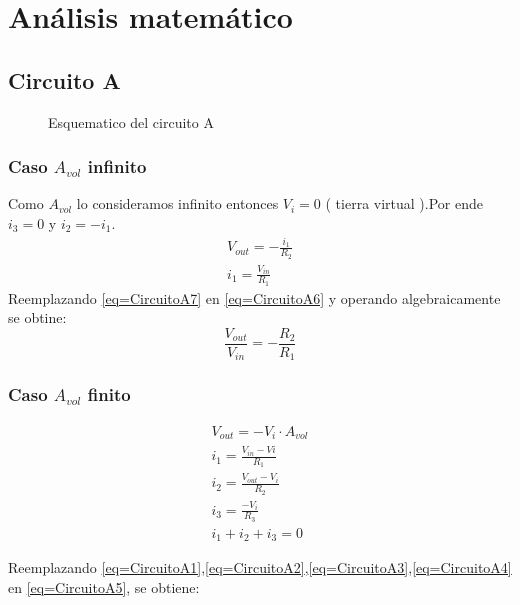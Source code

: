 \documentclass[../../main.tex]{subfiles}
\begin{document}
\section{An\'alisis matem\'atico}
\subsection{Circuito A}

\begin{figure}[H]
\centering



\caption{Esquematico del circuito A}
\end{figure}


\subsubsection{Caso $A_{vol}$ infinito}

Como $A_{vol}$ lo consideramos infinito entonces $V_{i}=0$ \big( tierra virtual \big).Por ende $i_{3}=0$ y $i_{2}=-i_{1}$.
\begin{gather}
V_{out}=-\frac{i_{1}}{R_{2}}\label{eq=CircuitoA6}\\
i_{1}=\frac{V_{in}}{R_{1}}\label{eq=CircuitoA7}
\end{gather}
Reemplazando \ref{eq=CircuitoA7} en \ref{eq=CircuitoA6} y operando algebraicamente se obtine:
\begin{equation}
\frac{V_{out}}{V_{in}}= -\frac{R_{2}}{R_{1}} \label{eq=CircuitoAideal}
\end{equation}


\subsubsection{Caso $A_{vol}$ finito}


\begin{gather}
V_{out}= -V_{i}\cdot A_{vol}\label{eq=CircuitoA1}\\
i_{1}=\frac{V_{in}-V{i}}{R_{1}}\label{eq=CircuitoA2}\\
i_{2}=\frac{V_{out}-V_{i}}{R_{2}}\label{eq=CircuitoA3}\\
i_{3}=\frac{-V_{i}}{R_{3}}\label{eq=CircuitoA4}\\
i_{1}+i_{2}+i_{3}=0\label{eq=CircuitoA5}
\end{gather}

Reemplazando \ref{eq=CircuitoA1},\ref{eq=CircuitoA2},\ref{eq=CircuitoA3},\ref{eq=CircuitoA4} en \ref{eq=CircuitoA5}, se obtiene:
\end{document}
